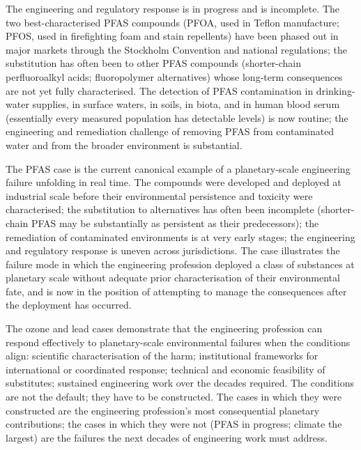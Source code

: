 The engineering and regulatory response is in progress and is incomplete. The two best-characterised PFAS compounds (PFOA, used in Teflon manufacture; PFOS, used in firefighting foam and stain repellents) have been phased out in major markets through the Stockholm Convention and national regulations; the substitution has often been to other PFAS compounds (shorter-chain perfluoroalkyl acids; fluoropolymer alternatives) whose long-term consequences are not yet fully characterised. The detection of PFAS contamination in drinking-water supplies, in surface waters, in soils, in biota, and in human blood serum (essentially every measured population has detectable levels) is now routine; the engineering and remediation challenge of removing PFAS from contaminated water and from the broader environment is substantial.

The PFAS case is the current canonical example of a planetary-scale engineering failure unfolding in real time. The compounds were developed and deployed at industrial scale before their environmental persistence and toxicity were characterised; the substitution to alternatives has often been incomplete (shorter-chain PFAS may be substantially as persistent as their predecessors); the remediation of contaminated environments is at very early stages; the engineering and regulatory response is uneven across jurisdictions. The case illustrates the failure mode in which the engineering profession deployed a class of substances at planetary scale without adequate prior characterisation of their environmental fate, and is now in the position of attempting to manage the consequences after the deployment has occurred.

\begin{principle}
The ozone and lead cases demonstrate that the engineering profession can respond effectively to planetary-scale environmental failures when the conditions align: scientific characterisation of the harm; institutional frameworks for international or coordinated response; technical and economic feasibility of substitutes; sustained engineering work over the decades required. The conditions are not the default; they have to be constructed. The cases in which they were constructed are the engineering profession's most consequential planetary contributions; the cases in which they were not (PFAS in progress; climate the largest) are the failures the next decades of engineering work must address.
\end{principle}

